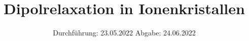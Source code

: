 

\subject{V48}
\title{Dipolrelaxation in Ionenkristallen}
\date{%
  Durchführung: 23.05.2022
  \hspace{3em}
  Abgabe: 24.06.2022
}



\maketitle
\thispagestyle{empty}
\tableofcontents
\newpage







\printbibliography{}


